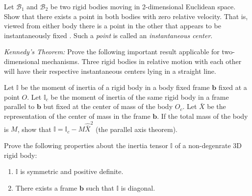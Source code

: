 \documentclass[graybox,envcountchap,sectrefs]{svmonoMuga}
\begin{document}

\begin{exercise}\label{ex:InstantaneousCenter}
Let $\mathcal{B}_1$ and $\mathcal{B}_2$ be two rigid bodies moving in 2-dimensional Euclidean space.  Show that there exists a point in both bodies with zero relative velocity. That is, viewed 
from either body there is a point in the other that appears to be instantaneously  fixed .
Such a \emph{point} is called an {\textit{instantaneous center}}. 
\end{exercise}


\begin{exercise}\label{ex:KennedysTheorem}\emph{Kennedy's Theorem:}
Prove the following important result applicable for two-dimensional mechanisms. 
Three rigid bodies in relative motion with each other will have 
their respective instantaneous centers lying in a straight line.
\end{exercise}


\begin{exercise}\label{ex:ParalleAxisTheorem}

Let $\mathbb{I}$ be the moment of inertia of a rigid body in a body fixed frame $\mathbf{b}$ fixed at a point $O$. 
Let $\mathbb{I}_c$ be the moment of inertia of the same rigid body in a frame parallel to $\mathbf{b}$ but fixed at the center of mass of the body $O_c$. Let $\bar{X}$ be the representation of the center of mass in the frame $\mathbf{b}$. If the total mass of the body is $M$,
show that $\mathbb{I}= \mathbb{I}_c-M\widehat{\bar{X}}^2$ (the parallel axis theorem).
\end{exercise}

\begin{exercise}
Prove the following properties about the inertia tensor $\mathbb{I}$ of a non-degenrate 3D rigid body:
\begin{enumerate}
\item $\mathbb{I}$ is symmetric and positive definite.
\item There exists a frame $\mathbf{b}$ such that $\mathbb{I}$ is diagonal.
\end{enumerate}
\end{exercise}

\end{document}
